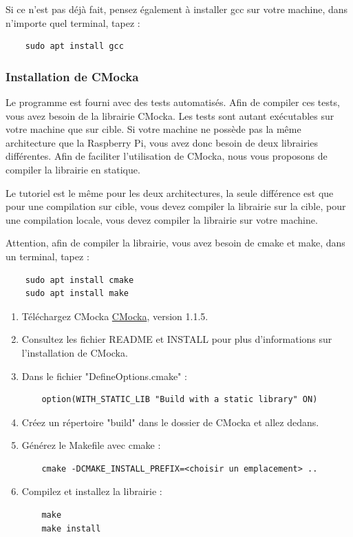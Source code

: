 Si ce n'est pas déjà fait, pensez également à installer gcc sur votre machine, dans n'importe quel terminal, tapez : 
\vspace{-1.8\baselineskip} 
\begin{lstlisting}
    sudo apt install gcc
\end{lstlisting}

\subsubsection{Installation de CMocka}

Le programme {\nomLogiciel} est fourni avec des tests automatisés. Afin de compiler ces tests, vous avez besoin de la librairie CMocka. Les tests sont autant exécutables sur votre machine que sur cible. Si votre machine ne possède pas la même architecture que la Raspberry Pi, vous avez donc besoin de deux librairies différentes. Afin de faciliter l'utilisation de CMocka, nous vous proposons de compiler la librairie en statique. \newline

Le tutoriel est le même pour les deux architectures, la seule différence est que pour une compilation sur cible, vous devez compiler la librairie sur la cible, pour une compilation locale, vous devez compiler la librairie sur votre machine. \newline

Attention, afin de compiler la librairie, vous avez besoin de cmake et make, dans un terminal, tapez :
\vspace{-1.8\baselineskip} 
\begin{lstlisting}
    sudo apt install cmake
    sudo apt install make
\end{lstlisting}

\begin{enumerate}
    \item Téléchargez CMocka \href{https://cmocka.org/}{CMocka}, version 1.1.5.
    \item Consultez les fichier README et INSTALL pour plus d'informations sur l'installation de CMocka.
    \item Dans le fichier "DefineOptions.cmake" : 
\vspace{-1.8\baselineskip} 
\begin{lstlisting}
    option(WITH_STATIC_LIB "Build with a static library" ON)
\end{lstlisting}
    \item Créez un répertoire "build" dans le dossier de CMocka et allez dedans.
    \item Générez le Makefile avec cmake :
\vspace{-1.8\baselineskip} 
\begin{lstlisting}
    cmake -DCMAKE_INSTALL_PREFIX=<choisir un emplacement> ..
\end{lstlisting}
    \item Compilez et installez la librairie :
\vspace{-1.8\baselineskip} 
\begin{lstlisting}
    make
    make install
\end{lstlisting}
\end{enumerate}

